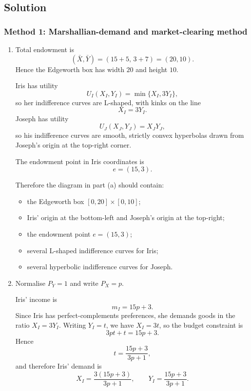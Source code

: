 \documentclass[12pt]{article}
\begin{document}
\newpage
\subsection{Solution}

\subsubsection{Method 1: Marshallian-demand and market-clearing method}

\begin{enumerate}[label=(\alph*)]
    \item
    Total endowment is
    \[
    (\bar X,\bar Y)=(15+5,\,3+7)=(20,10).
    \]
    Hence the Edgeworth box has width \(20\) and height \(10\).

    Iris has utility
    \[
    U_I(X_I,Y_I)=\min\{X_I,3Y_I\},
    \]
    so her indifference curves are L-shaped, with kinks on the line
    \[
    X_I=3Y_I.
    \]
    Joseph has utility
    \[
    U_J(X_J,Y_J)=X_JY_J,
    \]
    so his indifference curves are smooth, strictly convex hyperbolas drawn from Joseph's origin at the top-right corner.

    The endowment point in Iris coordinates is
    \[
    e=(15,3).
    \]

    Therefore the diagram in part (a) should contain:
    \begin{itemize}
        \item the Edgeworth box \([0,20]\times[0,10]\);
        \item Iris' origin at the bottom-left and Joseph's origin at the top-right;
        \item the endowment point \(e=(15,3)\);
        \item several L-shaped indifference curves for Iris;
        \item several hyperbolic indifference curves for Joseph.
    \end{itemize}

    \item
    Normalise \(P_Y=1\) and write \(P_X=p\).

    Iris' income is
    \[
    m_I=15p+3.
    \]
    Since Iris has perfect-complements preferences, she demands goods in the ratio \(X_I=3Y_I\). Writing \(Y_I=t\), we have \(X_I=3t\), so the budget constraint is
    \[
    3pt+t=15p+3.
    \]
    Hence
    \[
    t=\frac{15p+3}{3p+1},
    \]
    and therefore Iris' demand is
    \[
    X_I=\frac{3(15p+3)}{3p+1},\qquad
    Y_I=\frac{15p+3}{3p+1}.
    \]


\end{enumerate}
\end{document}
